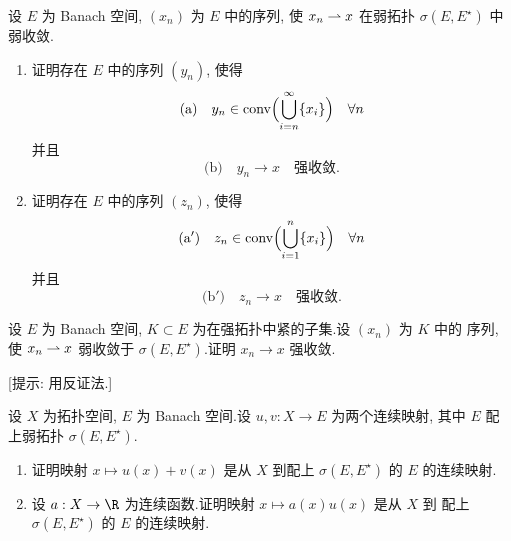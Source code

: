 \begin{exercise}
\label{exer:3.4}
设 $E$ 为 Banach 空间, $(x_n)$ 为 $E$ 中的序列, 使 $x_n\rightharpoonup x$ 在弱拓扑
$\sigma(E,E^\star)$ 中弱收敛.

\begin{enumerate}[label=\arabic*., leftmargin=2.2em, itemsep=0.25em]
	\item 证明存在 $E$ 中的序列 $(y_n)$, 使得
	      \begin{equation*}
	      \text{(a)}\quad y_n\in\operatorname{conv}\Bigl(\bigcup_{i=n}^\infty\{x_i\}\Bigr)
	      \quad\forall n
	      \end{equation*}
	      并且
	      \begin{equation*}
	      \text{(b)}\quad y_n\to x\quad\text{强收敛}.
	      \end{equation*}
	\item 证明存在 $E$ 中的序列 $(z_n)$, 使得
	      \begin{equation*}
	      \text{(a$'$)}\quad z_n\in\operatorname{conv}\Bigl(\bigcup_{i=1}^n\{x_i\}\Bigr)
	      \quad\forall n
	      \end{equation*}
	      并且
	      \begin{equation*}
	      \text{(b$'$)}\quad z_n\to x\quad\text{强收敛}.
	      \end{equation*}
\end{enumerate}
\end{exercise}

\begin{exercise}
\label{exer:3.5}
设 $E$ 为 Banach 空间, $K\subset E$ 为在强拓扑中紧的子集.设 $(x_n)$ 为 $K$ 中的
序列, 使 $x_n\rightharpoonup x$ 弱收敛于 $\sigma(E,E^\star)$.证明 $x_n\to x$ 强收敛.

[提示: 用反证法.]
\end{exercise}

\begin{exercise}
\label{exer:3.6}
设 $X$ 为拓扑空间, $E$ 为 Banach 空间.设 $u,v:X\to E$ 为两个连续映射, 其中
$E$ 配上弱拓扑 $\sigma(E,E^\star)$.

\begin{enumerate}[label=\arabic*., leftmargin=2.2em, itemsep=0.25em]
	\item 证明映射 $x\mapsto u(x)+v(x)$ 是从 $X$ 到配上 $\sigma(E,E^\star)$ 的
	      $E$ 的连续映射.
	\item 设 $a:X\to\R$ 为连续函数.证明映射 $x\mapsto a(x)u(x)$ 是从 $X$ 到
	      配上 $\sigma(E,E^\star)$ 的 $E$ 的连续映射.
\end{enumerate}
\end{exercise}

